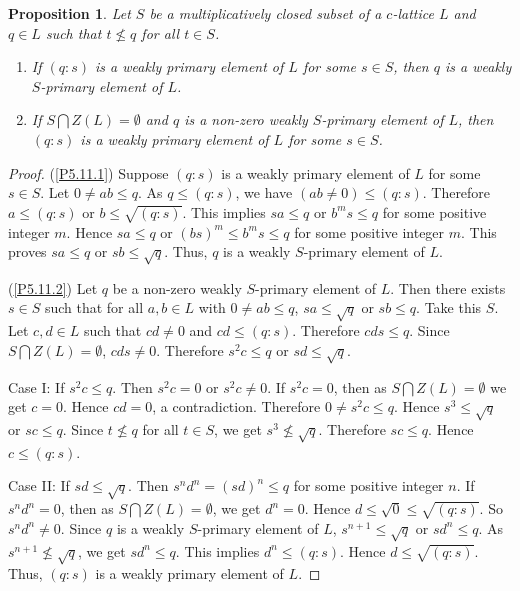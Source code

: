 \documentclass[10pt,twoside,a4paper]{amsart}
\numberwithin{equation}{section}
\theoremstyle{plain}
\newtheorem{prop}[lem]{Proposition}
\theoremstyle{definition}
\begin{document}
\begin{prop}%
	Let $S$ be a multiplicatively closed subset of a $c$-lattice $L$ and $q \in L$ such that $t\nleq q$ for all $t\in S$. 
	\begin{enumerate}
		\item\label{P5.11.1} If $(q:s)$ is a weakly primary element of $L$ for some $s\in S$, then $q$ is a weakly $S$-primary element of $L$.
		\item\label{P5.11.2} If $S\bigcap Z(L)=\emptyset$ and $q$ is a non-zero weakly $S$-primary element of $L$, then $(q:s)$ is a weakly primary element of $L$ for some $s\in S$.
	\end{enumerate}
\end{prop}
\begin{proof}
	(\ref{P5.11.1}) Suppose $(q:s)$ is a weakly primary element of $L$ for some $s\in S$. Let $0 \neq ab \leq q$. As $q \leq (q:s)$, we have  $(ab \neq 0 ) \leq (q:s)$. Therefore $a\leq (q:s)$ or $b\leq \sqrt{(q:s)}$. This implies $sa\leq q$ or $b^ms\leq q$ for some positive integer $m$. Hence $sa\leq q$ or $(bs)^m\leq b^ms\leq q$ for some positive integer $m$. This proves $sa\leq q$ or $sb\leq \sqrt{q}$. Thus, $q$ is a weakly $S$-primary element of $L$.
	
	(\ref{P5.11.2}) Let $q$ be a non-zero weakly $S$-primary element of $L$. Then there exists $s\in S$ such that for all $a,b\in L$ with $0 \neq ab \leq q$, $sa\leq \sqrt{q}$ or $sb\leq q$. Take this $S$. Let $ c, d \in L$ such that $ cd \neq 0 $ and   $ cd \leq (q:s)$. Therefore $cds\leq q$. Since $S\bigcap Z(L)=\emptyset$, $cds\neq 0$. Therefore $s^2c\leq q$ or $sd\leq \sqrt{q}$.
	
	Case I: If $s^2c\leq q$. Then $s^2 c = 0$ or $s^2 c \neq 0$. If $s^2c=0$, then as $S\bigcap Z(L)=\emptyset$ we get $c=0$. Hence $cd=0$, a contradiction. Therefore $ 0 \neq s^2 c\leq q$. Hence $s^3\leq \sqrt{q}$ or $sc\leq q$. Since $t\nleq q$ for all $t\in S$, we get  $s^3\nleq \sqrt{q}$. Therefore $sc\leq q$. Hence $c\leq (q:s)$.
	
	Case II: If	$sd\leq \sqrt{q}$. Then $s^nd^n=(sd)^n\leq q$ for some positive integer $n$. If $s^nd^n=0$, then as $S\bigcap Z(L)=\emptyset$, we get $d^n=0$. Hence $d\leq \sqrt{0}\leq \sqrt{(q:s)}$. So $s^nd^n\neq 0$. Since $q$ is a  weakly $S$-primary element of $L$, $s^{n+1}\leq \sqrt{q}$ or $sd^n\leq q$. As $s^{n+1}\nleq \sqrt{q}$, we get $sd^n\leq q$. This implies $d^n\leq (q:s)$. Hence $d\leq \sqrt{(q:s)}$. Thus, $(q:s)$ is a weakly primary element of $L$.
\end{proof}
\end{document}
